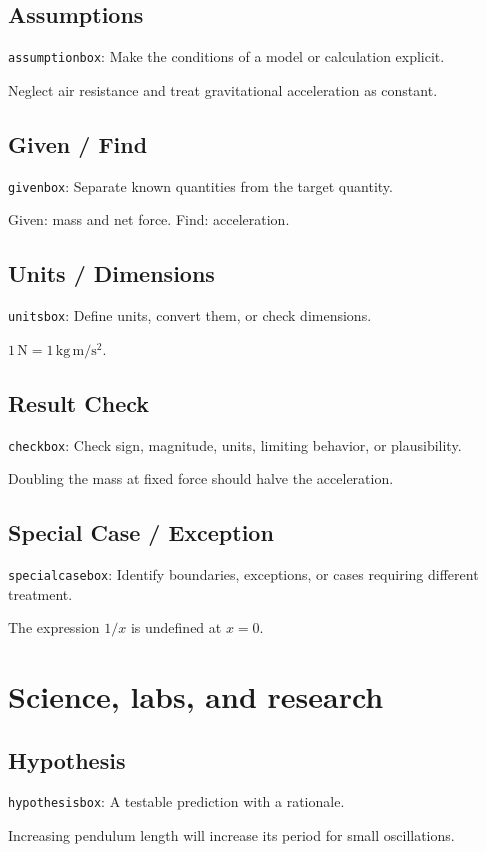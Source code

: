 \documentclass[11pt]{article}
\begin{document}
\subsection{Assumptions}
{\small\texttt{assumptionbox}: Make the conditions of a model or calculation explicit.}
\begin{assumptionbox}
Neglect air resistance and treat gravitational acceleration as constant.
\end{assumptionbox}
\subsection{Given / Find}
{\small\texttt{givenbox}: Separate known quantities from the target quantity.}
\begin{givenbox}
Given: mass and net force. Find: acceleration.
\end{givenbox}
\subsection{Units / Dimensions}
{\small\texttt{unitsbox}: Define units, convert them, or check dimensions.}
\begin{unitsbox}
$1\,\mathrm{N}=1\,\mathrm{kg\,m/s^2}$.
\end{unitsbox}
\subsection{Result Check}
{\small\texttt{checkbox}: Check sign, magnitude, units, limiting behavior, or plausibility.}
\begin{checkbox}
Doubling the mass at fixed force should halve the acceleration.
\end{checkbox}
\subsection{Special Case / Exception}
{\small\texttt{specialcasebox}: Identify boundaries, exceptions, or cases requiring different treatment.}
\begin{specialcasebox}
The expression $1/x$ is undefined at $x=0$.
\end{specialcasebox}

\clearpage
\section{Science, labs, and research}
\subsection{Hypothesis}
{\small\texttt{hypothesisbox}: A testable prediction with a rationale.}
\begin{hypothesisbox}
Increasing pendulum length will increase its period for small oscillations.
\end{hypothesisbox}
\end{document}
